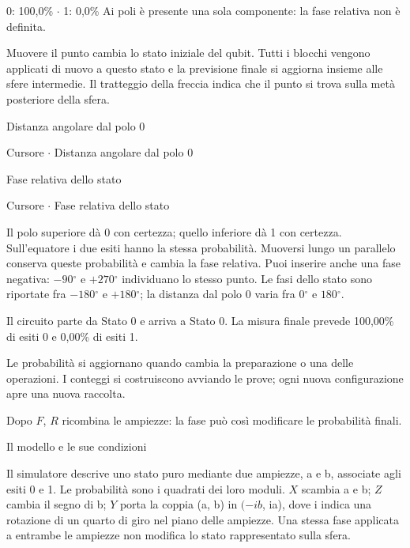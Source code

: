 0: 100,0\% \(\cdot\) 1: 0,0\% Ai poli è presente una sola componente: la fase relativa non è definita.\par

Muovere il punto cambia lo stato iniziale del qubit. Tutti i blocchi vengono applicati di nuovo a questo stato e la previsione finale si aggiorna insieme alle sfere intermedie. Il tratteggio della freccia indica che il punto si trova sulla metà posteriore della sfera.\par

Distanza angolare dal polo 0\par

Cursore \(\cdot\) Distanza angolare dal polo 0\par

Fase relativa dello stato\par

Cursore \(\cdot\) Fase relativa dello stato\par

Il polo superiore dà 0 con certezza; quello inferiore dà 1 con certezza. Sull'equatore i due esiti hanno la stessa probabilità. Muoversi lungo un parallelo conserva queste probabilità e cambia la fase relativa. Puoi inserire anche una fase negativa: \(- 90{}^{\circ} \) e \(+270{}^{\circ} \) individuano lo stesso punto. Le fasi dello stato sono riportate fra \(- 180{}^{\circ} \) e \(+180{}^{\circ} \); la distanza dal polo 0 varia fra \(0{}^{\circ} \) e \(180{}^{\circ} \).\par


Il circuito parte da Stato 0 e arriva a Stato 0. La misura finale prevede 100,00\% di esiti 0 e 0,00\% di esiti 1.\par

Le probabilità si aggiornano quando cambia la preparazione o una delle operazioni. I conteggi si costruiscono avviando le prove; ogni nuova configurazione apre una nuova raccolta.\par

Dopo \(F\), \(R\) ricombina le ampiezze: la fase può così modificare le probabilità finali.\par


Il modello e le sue condizioni\par

Il simulatore descrive uno stato puro mediante due ampiezze, a e b, associate agli esiti 0 e 1. Le probabilità sono i quadrati dei loro moduli. \(X\) scambia a e b; \(Z\) cambia il segno di b; \(Y\) porta la coppia (a, b) in \((- ib\), ia), dove i indica una rotazione di un quarto di giro nel piano delle ampiezze. Una stessa fase applicata a entrambe le ampiezze non modifica lo stato rappresentato sulla sfera.\par

